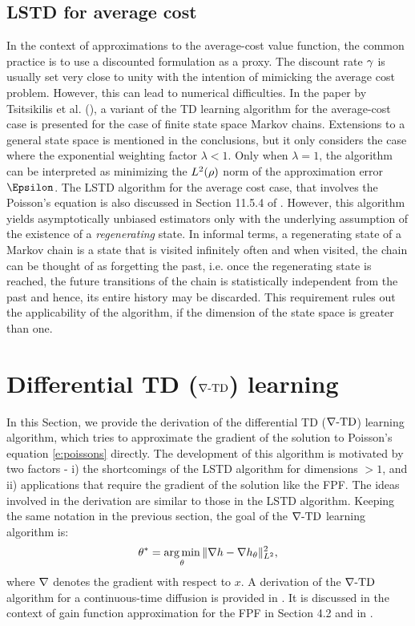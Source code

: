 \subsection{LSTD for average cost}
\label{s:lstd_avg_cost}
In the context of approximations to the average-cost value function, the common practice is to use a discounted formulation as a proxy. The discount rate $\gamma$ is usually set very close to unity with the intention of mimicking the average cost problem. However, this can lead to numerical difficulties.  In the paper by Tsitsikilis et al. (\cite{tsivan99b}), a variant of the TD learning algorithm for the average-cost case is presented for the case of finite state space Markov chains. Extensions to a general state space is mentioned in the conclusions, but it only considers the case where the exponential weighting factor $\lambda <1$. Only when $\lambda =1$, the algorithm can be interpreted as minimizing the $L^2(\rho)$ norm of the approximation error $\Epsilon$. 
% 
The LSTD algorithm for the average cost case, that involves the Poisson's equation is also discussed in Section 11.5.4 of \cite{ctcn}. However, this algorithm yields asymptotically unbiased estimators only with the underlying assumption of the existence of a \textit{regenerating} state. In informal terms, a regenerating state of a Markov chain is a state that is visited infinitely often and when visited, the chain can be thought of as forgetting the past, i.e. once the regenerating state is reached, the future transitions of the chain is statistically independent from the past and hence, its entire history may be discarded. This requirement rules out the applicability of the algorithm, if the dimension of the state space is greater than one. 


\section{Differential TD ($\nabla\text{-TD}$) learning}
\label{s:diff_td_learning}
In this Section, we provide the derivation of the differential TD ($\nabla\text{-TD}$) learning algorithm, which tries to approximate the gradient of the solution to Poisson's equation \eqref{e:poissons} directly. The development of this algorithm is motivated by two factors - i) the shortcomings of the LSTD algorithm for dimensions $>1$, and ii) applications that require the gradient of the solution like the FPF. The ideas involved in the derivation are similar to those in the LSTD algorithm. Keeping the same notation in the previous section, the goal of the $\nabla\text{-TD}$ learning algorithm is:
\begin{equation}
\param^* = \argmin_\param \| \grad h -\grad h_\param\|^2_{L^2},
\label{e:gradTD_norm_error}
\end{equation}
where $\nabla$ denotes the gradient with respect to $x$. A derivation of the $\nabla\text{-TD}$ algorithm for a continuous-time diffusion is provided in \cite{devmey16arXiv}. It is discussed in the context of gain function approximation for the FPF in Section 4.2 and in \cite{raddevmey16}. 

